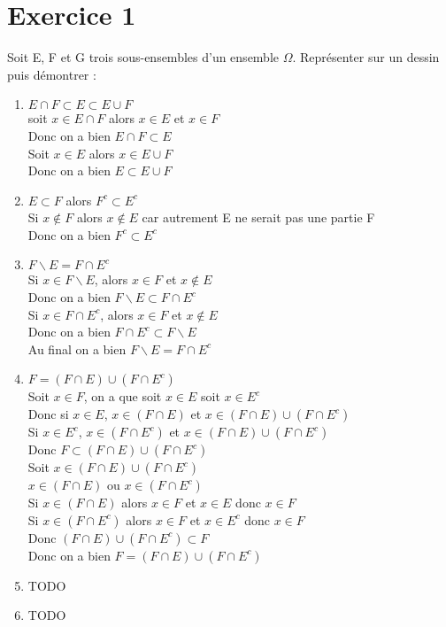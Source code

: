 \documentclass{article}
\author{Frederic Becerril}
\begin{document}
\part*{Exercice 1}

Soit E, F et G trois sous-ensembles d'un ensemble $\Omega$. Représenter sur un dessin puis démontrer :
\begin{enumerate}
    \item $E \cap F \subset E \subset E \cup F$\\
soit $x \in E \cap F$ alors $x \in E$ et $x \in F$\\
Donc on a bien $E \cap F \subset E$\\
Soit $x \in E$ alors $x \in E \cup F$\\
Donc on a bien $E \subset E \cup F$
    \item $E \subset F$ alors $F^c \subset E^c$\\
Si $x \notin F$ alors $x \notin E$ car autrement E ne serait pas une partie F\\
Donc on a bien $F^c \subset E^c$
    \item $F \backslash E = F \cap E^c$\\
Si $x \in F \backslash E$, alors $x \in F$ et $x \notin E$\\
Donc on a bien $F \backslash E \subset F \cap E^c$\\
Si $x \in F \cap E^c$, alors $x \in F$ et $x \notin E$\\
Donc on a bien $F \cap E^c \subset F \backslash E$\\
Au final on a bien $F \backslash E = F \cap E^c$
    \item $F = (F \cap E) \cup (F \cap E^c)$\\
Soit $x \in F$, on a que soit $x \in E$ soit $x \in E^c$\\
Donc si $x \in E$, $x \in (F \cap E)$ et $x \in (F \cap E) \cup (F \cap E^c)$\\
Si $x \in E^c$, $x \in (F \cap E^c)$ et $x \in (F \cap E) \cup (F \cap E^c)$\\
Donc $F \subset (F \cap E) \cup (F \cap E^c)$\\
Soit $x \in (F \cap E) \cup (F \cap E^c)$\\
$x \in (F \cap E)$ ou $x \in (F \cap E^c)$\\
Si $x \in (F \cap E)$ alors $x \in F$ et $x \in E$ donc $x \in F$\\
Si $x \in (F \cap E^c)$ alors $x \in F$ et $x \in E^c$ donc $x \in F$\\
Donc $(F \cap E) \cup (F \cap E^c) \subset F$\\
Donc on a bien $F = (F \cap E) \cup (F \cap E^c)$
    \item TODO
    \item TODO
\end{enumerate}
\end{document}
